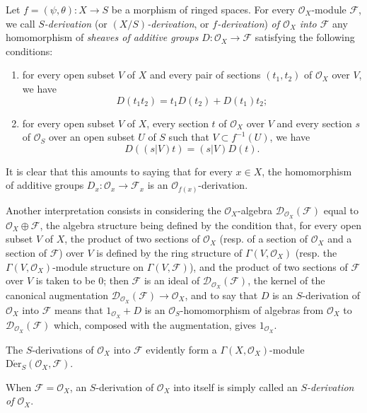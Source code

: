 \begin{env}[16.5.1]\label{IV.16.5.1}
Let $f=(\psi,\theta):X\to S$ be a morphism of ringed spaces. For every
$\mathcal{O}_X$-module $\mathscr{F}$, we call \emph{$S$-derivation}
(or \emph{$(X/S)$-derivation}, or \emph{$f$-derivation}) \emph{of
$\mathcal{O}_X$ into $\mathscr{F}$} any homomorphism of \emph{sheaves of
additive groups} $D:\mathcal{O}_X\to\mathscr{F}$ satisfying the following
conditions:
\begin{enumerate}
\item[(a)] for every open subset $V$ of $X$ and every pair of sections
$(t_1,t_2)$ of $\mathcal{O}_X$ over $V$, we have
\[
  D(t_1t_2)=t_1D(t_2)+D(t_1)t_2;
  \tag{16.5.1.1}
  \label{IV.16.5.1.1}
\]
\item[(b)] for every open subset $V$ of $X$, every section $t$ of $\mathcal{O}_X$
over $V$ and every section $s$ of $\mathcal{O}_S$ over an open subset
$U$ of $S$ such that $V\subset f^{-1}(U)$, we have
\[
  D((s|V)t)=(s|V)D(t).
  \tag{16.5.1.2}
  \label{IV.16.5.1.2}
\]
\end{enumerate}
It is clear that this amounts to saying that for every $x\in X$,
the homomorphism of additive groups
$D_x:\mathcal{O}_x\to\mathscr{F}_x$ is an
$\mathcal{O}_{f(x)}$-derivation.

Another interpretation consists in considering the $\mathcal{O}_X$-algebra
$\mathscr{D}_{\mathcal{O}_X}(\mathscr{F})$ equal to
$\mathcal{O}_X\oplus\mathscr{F}$, the algebra structure being defined by the
condition that, for every open subset $V$ of $X$, the product of two sections of
$\mathcal{O}_X$ (resp. of a section of $\mathcal{O}_X$ and a section of
$\mathscr{F}$) over $V$ is defined by the ring structure of
$\Gamma(V,\mathcal{O}_X)$ (resp. the
$\Gamma(V,\mathcal{O}_X)$-module structure on $\Gamma(V,\mathscr{F})$), and the
product of two sections of $\mathscr{F}$ over $V$ is taken to be 0; then
$\mathscr{F}$ is an ideal of
$\mathscr{D}_{\mathcal{O}_X}(\mathscr{F})$, the kernel of the canonical augmentation
$\mathscr{D}_{\mathcal{O}_X}(\mathscr{F})\to\mathcal{O}_X$, and to say that $D$
is an $S$-derivation of $\mathcal{O}_X$ into $\mathscr{F}$ means that
$1_{\mathcal{O}_X}+D$ is an $\mathcal{O}_S$-homomorphism of algebras from
$\mathcal{O}_X$ to $\mathscr{D}_{\mathcal{O}_X}(\mathscr{F})$ which, composed
with the augmentation, gives $1_{\mathcal{O}_X}$.

The $S$-derivations of $\mathcal{O}_X$ into $\mathscr{F}$ evidently form
a $\Gamma(X,\mathcal{O}_X)$-module
$\operatorname{D\acute{e}r}_S(\mathcal{O}_X,\mathscr{F})$.

When $\mathscr{F}=\mathcal{O}_X$, an $S$-derivation of $\mathcal{O}_X$ into
itself is simply called an \emph{$S$-derivation of $\mathcal{O}_X$}.
\end{env}

